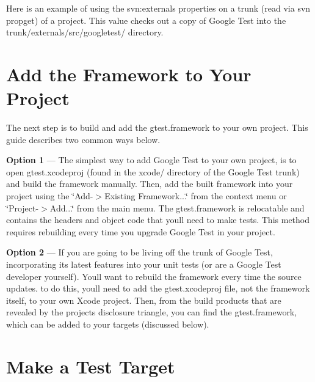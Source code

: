 Here is an example of using the svn\+:externals properties on a trunk (read via {\ttfamily svn propget}) of a project. This value checks out a copy of Google Test into the {\ttfamily trunk/externals/src/googletest/} directory.


\begin{DoxyCode}{0}
\end{DoxyCode}


\section*{Add the Framework to Your Project}

The next step is to build and add the gtest.\+framework to your own project. This guide describes two common ways below.


\begin{DoxyItemize}
\item {\bfseries{Option 1}} --- The simplest way to add Google Test to your own project, is to open gtest.\+xcodeproj (found in the xcode/ directory of the Google Test trunk) and build the framework manually. Then, add the built framework into your project using the \char`\"{}\+Add-\/$>$\+Existing Framework...\char`\"{} from the context menu or \char`\"{}\+Project-\/$>$\+Add...\char`\"{} from the main menu. The gtest.\+framework is relocatable and contains the headers and object code that you\textquotesingle{}ll need to make tests. This method requires rebuilding every time you upgrade Google Test in your project.
\item {\bfseries{Option 2}} --- If you are going to be living off the trunk of Google Test, incorporating its latest features into your unit tests (or are a Google Test developer yourself). You\textquotesingle{}ll want to rebuild the framework every time the source updates. to do this, you\textquotesingle{}ll need to add the gtest.\+xcodeproj file, not the framework itself, to your own Xcode project. Then, from the build products that are revealed by the project\textquotesingle{}s disclosure triangle, you can find the gtest.\+framework, which can be added to your targets (discussed below).
\end{DoxyItemize}

\section*{Make a Test Target}

